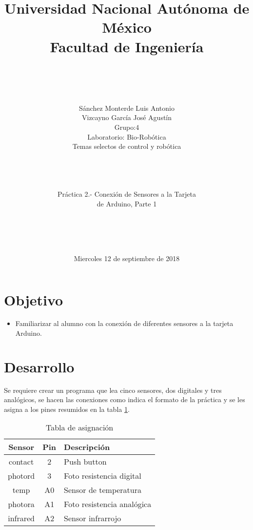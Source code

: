 \documentclass[letterpaper]{article}
\title{Universidad Nacional Autónoma de México\\
Facultad de Ingeniería\\}
\author{\\
  	\\
	\\
	\\
	Sánchez Monterde Luis Antonio\\
	Vizcayno García José Agustín
  	\\
	Grupo:4\\
	Laboratorio: Bio-Robótica\\
	Temas selectos de control y robótica\\
      \\
    \\
  \\
\\
	Práctica 2.- Conexión de Sensores a la Tarjeta\\
      de Arduino, Parte 1\\
    \\
  \\
  \\
  \\
}
\date{Miercoles 12 de septiembre de 2018}
\begin{document}
\newcommand{\figura}[3]{
\begin{figure}[hbtp]
  \centering
  \texttt{[image: \#1]}
  \caption{#2}
  \label{fig:#1}
\end{figure}
}
\maketitle
\clearpage
\section{Objetivo}
\begin{itemize}
  \item Familiarizar al alumno con la conexión de diferentes sensores a 
    la tarjeta  Arduino.
\end{itemize}
\section{Desarrollo}
Se requiere crear un programa que lea cinco sensores, dos digitales y tres
analógicos, se hacen las conexiones como indica el formato de la práctica y
se les asigna a los pines resumidos en la tabla \ref{tab:pines}.
\begin{table}
  \centering
  \begin{tabular}{c|c|l}
    Sensor & Pin & Descripción \\
    \hline
    \hline
    contact & 2 & Push button\\
    photord & 3 & Foto resistencia digital\\
    temp & A0 &  Sensor de temperatura\\
    photora & A1 & Foto resistencia analógica\\
    infrared & A2 & Sensor infrarrojo
  \end{tabular}
  \caption{Tabla de asignación}
  \label{tab:pines}
\end{table}
\end{document}
